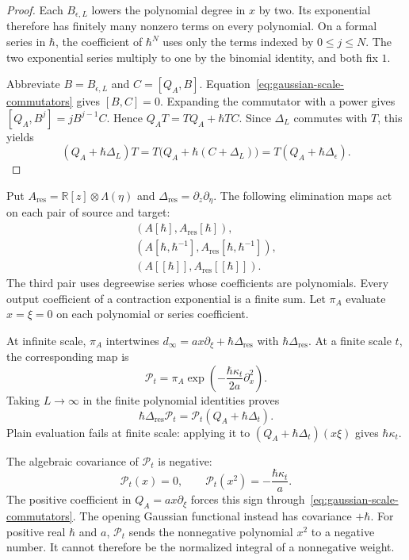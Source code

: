 \begin{proof}
Each $B_{\epsilon,L}$ lowers the polynomial degree in $x$ by two.
Its exponential therefore has finitely many nonzero terms on every
polynomial. On a formal series in $\hbar$, the coefficient of
$\hbar^N$ uses only the terms indexed by $0\leq j\leq N$.
The two exponential series multiply to one by the binomial identity,
and both fix $1$.

Abbreviate $B=B_{\epsilon,L}$ and $C=[Q_A,B]$.
Equation~\eqref{eq:gaussian-scale-commutators} gives $[B,C]=0$.
Expanding the commutator with a power gives
$[Q_A,B^j]=jB^{j-1}C$.
Hence $Q_AT=TQ_A+\hbar TC$.
Since $\Delta_L$ commutes with $T$, this yields
\[
 (Q_A+\hbar\Delta_L)T
 =T\bigl(Q_A+\hbar(C+\Delta_L)\bigr)
 =T(Q_A+\hbar\Delta_\epsilon).
\]
\end{proof}

Put $A_{\mathrm{res}}=\mathbb R[z]\otimes\Lambda(\eta)$ and
$\Delta_{\mathrm{res}}=\partial_z\partial_\eta$.
The following elimination maps act on each pair of source and target:
\[
 \begin{gathered}
 (A[\hbar],A_{\mathrm{res}}[\hbar]),\\
 (A[\hbar,\hbar^{-1}],A_{\mathrm{res}}[\hbar,\hbar^{-1}]),\\
 (A[[\hbar]],A_{\mathrm{res}}[[\hbar]]).
 \end{gathered}
\]
The third pair uses degreewise series whose coefficients are polynomials.
Every output coefficient of a contraction exponential is a finite sum.
Let $\pi_A$ evaluate $x=\xi=0$ on each polynomial or series coefficient.

At infinite scale, $\pi_A$ intertwines
$d_\infty=ax\partial_\xi+\hbar\Delta_{\mathrm{res}}$ with
$\hbar\Delta_{\mathrm{res}}$.
At a finite scale $t$, the corresponding map is
\begin{equation}\label{eq:gaussian-residual-map}
 \mathcal P_t
 =\pi_A\exp\left(-\frac{\hbar\kappa_t}{2a}\partial_x^2\right).
\end{equation}
Taking $L\to\infty$ in the finite polynomial identities proves
\[
 \hbar\Delta_{\mathrm{res}}\mathcal P_t
 =\mathcal P_t(Q_A+\hbar\Delta_t).
\]
Plain evaluation fails at finite scale: applying it to
$(Q_A+\hbar\Delta_t)(x\xi)$ gives $\hbar\kappa_t$.

The algebraic covariance of $\mathcal P_t$ is negative:
\[
 \mathcal P_t(x)=0,\qquad
 \mathcal P_t(x^2)=-\frac{\hbar\kappa_t}{a}.
\]
The positive coefficient in $Q_A=ax\partial_\xi$ forces this sign
through~\eqref{eq:gaussian-scale-commutators}.
The opening Gaussian functional instead has covariance $+\hbar$.
For positive real $\hbar$ and $a$, $\mathcal P_t$ sends the nonnegative
polynomial $x^2$ to a negative number.
It cannot therefore be the normalized integral of a nonnegative weight.

